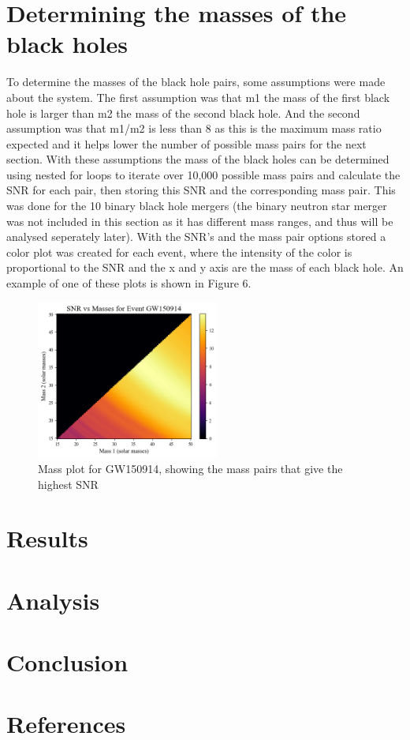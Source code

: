 \documentclass[]{article}
\begin{document}
\section*{Determining the masses of the black holes}
To determine the masses of the black hole pairs, some assumptions were made
about the system. The first assumption was that m1 the mass of the first black hole is larger
than m2 the mass of the second black hole. And the second assumption was that m1/m2 is less than 8
as this is the maximum mass ratio expected and it helps lower the number of possible mass pairs
for the next section. With these assumptions the mass of the black holes can be determined using
nested for loops to iterate over 10,000 possible mass pairs and calculate the SNR for each pair, then storing this
SNR and the corresponding mass pair. This was done for the 10 binary black hole mergers (the binary neutron star
merger was not included in this section as it has different mass ranges, and thus will be analysed seperately
later). With the SNR's and the mass pair options stored a color plot was created for each event, where
the intensity of the color is proportional to the SNR and the x and y axis are the mass of each black hole.
An example of one of these plots is shown in Figure 6.
\begin{figure}[h]
    \includegraphics[width=6cm]{images/snr_color.png}
    \caption{Mass plot for GW150914, showing the mass pairs that give the highest SNR}
    \label{fig:mass_plot}
\end{figure}





\section*{Results}



\section*{Analysis}

\section*{Conclusion}

\section*{References}
\end{document}
